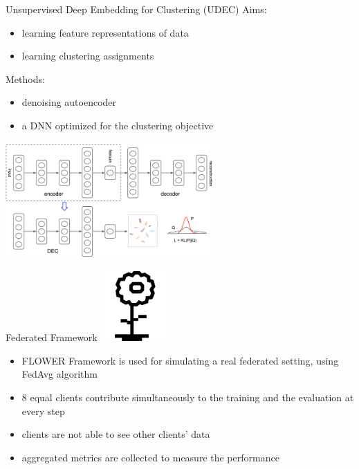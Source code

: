\documentclass{beamer}
\begin{document}
\begin{frame}{Unsupervised Deep Embedding for Clustering (UDEC)}
	Aims:\cite{DBLP:journals/corr/XieGF15}
	\begin{itemize}
		\item learning feature representations of data
		\item learning clustering assignments
	\end{itemize}
	Methods:
	\begin{itemize}
		\item denoising autoencoder
		\item a DNN optimized for the clustering objective
	\end{itemize}
	\centering
	\includegraphics[width=0.6\textwidth, keepaspectratio]{./images/UDE_model.png}
\end{frame}

\begin{frame}{Federated Framework\cite{beutel2021flower}}
	\centering
	\includegraphics[width=0.2\textwidth, keepaspectratio]{./images/flower-logo.png}
	\begin{itemize}
		\item FLOWER Framework is used for simulating a real federated setting, using FedAvg algorithm
		\item 8 equal clients contribute simultaneously to the training and the evaluation at every step
		\item clients are not able to see other clients' data
		\item aggregated metrics are collected to measure the performance
	\end{itemize}
	\end{frame}

\end{document}
